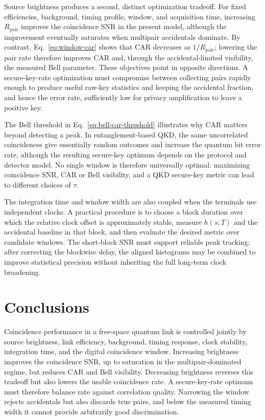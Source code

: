 \documentclass[a4paper,10pt]{article}
\begin{document}
Source brightness produces a second, distinct optimization tradeoff.  For
fixed efficiencies, background, timing profile, window, and acquisition time,
increasing $R_{\mathrm{pair}}$ improves the coincidence SNR in the present
model, although the improvement eventually saturates when multipair
accidentals dominate.  By contrast, Eq.~\eqref{eq:window-car} shows that CAR
decreases as $1/R_{\mathrm{pair}}$; lowering the pair rate therefore improves
CAR and, through the accidental-limited visibility, the measured Bell
parameter.  These objectives point in opposite directions.  A secure-key-rate
optimization must compromise between collecting pairs rapidly enough to
produce useful raw-key statistics and keeping the accidental fraction, and
hence the error rate, sufficiently low for privacy amplification to leave a
positive key.

The Bell threshold in Eq.~\eqref{eq:bell-car-threshold} illustrates why CAR matters beyond detecting a peak.  In entanglement-based QKD, the same uncorrelated coincidences give essentially random outcomes and increase the quantum bit error rate, although the resulting secure-key optimum depends on the protocol and detector model.  No single window is therefore universally optimal: maximizing coincidence SNR, CAR or Bell visibility, and a QKD secure-key metric can lead to different choices of $\tau$.

The integration time and window width are also coupled when the terminals use independent clocks.  A practical procedure is to choose a block duration over which the relative clock offset is approximately stable, measure $h(s;T)$ and the accidental baseline in that block, and then evaluate the desired metric over candidate windows.  The short-block SNR must support reliable peak tracking; after correcting the blockwise delay, the aligned histograms may be combined to improve statistical precision without inheriting the full long-term clock broadening.

\section{Conclusions}
\label{sec:conclusion}

Coincidence performance in a free-space quantum link is controlled jointly by source brightness, link efficiency, background, timing response, clock stability, integration time, and the digital coincidence window.  Increasing brightness improves the coincidence SNR, up to saturation in the multipair-dominated regime, but reduces CAR and Bell visibility.  Decreasing brightness reverses this tradeoff but also lowers the usable coincidence rate.  A secure-key-rate optimum must therefore balance rate against correlation quality.  Narrowing the window rejects accidentals but also discards true pairs, and below the measured timing width it cannot provide arbitrarily good discrimination.
\end{document}
